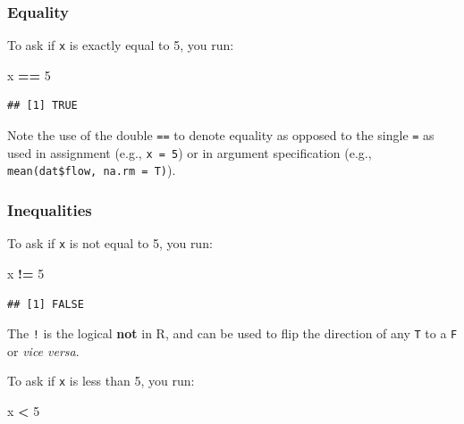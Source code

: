 \documentclass[]{book}
\newenvironment{Shaded}{\begin{snugshade}}{\end{snugshade}}
\newcommand{\DecValTok}[1]{\textcolor[rgb]{0.00,0.00,0.81}{#1}}
\newcommand{\StringTok}[1]{\textcolor[rgb]{0.31,0.60,0.02}{#1}}
\newcommand{\OperatorTok}[1]{\textcolor[rgb]{0.81,0.36,0.00}{\textbf{#1}}}
\newcommand{\NormalTok}[1]{#1}
\theoremstyle{definition}
\theoremstyle{definition}
\theoremstyle{definition}
\theoremstyle{remark}
\begin{document}
\subsubsection*{Equality}\label{equality}

To ask if \texttt{x} is exactly equal to 5, you run:

\begin{Shaded}
\begin{Highlighting}[]
\NormalTok{x }\OperatorTok{==}\StringTok{ }\DecValTok{5}
\end{Highlighting}
\end{Shaded}

\begin{verbatim}
## [1] TRUE
\end{verbatim}

Note the use of the double \texttt{==} to denote equality as opposed to
the single \texttt{=} as used in assignment (e.g., \texttt{x\ =\ 5}) or
in argument specification (e.g.,
\texttt{mean(dat\$flow,\ na.rm\ =\ T)}).

\subsubsection*{Inequalities}\label{inequalities}

To ask if \texttt{x} is not equal to 5, you run:

\begin{Shaded}
\begin{Highlighting}[]
\NormalTok{x }\OperatorTok{!=}\StringTok{ }\DecValTok{5}
\end{Highlighting}
\end{Shaded}

\begin{verbatim}
## [1] FALSE
\end{verbatim}

The \texttt{!} is the logical \textbf{not} in R, and can be used to flip
the direction of any \texttt{T} to a \texttt{F} or \emph{vice versa}.

To ask if \texttt{x} is less than 5, you run:

\begin{Shaded}
\begin{Highlighting}[]
\NormalTok{x }\OperatorTok{<}\StringTok{ }\DecValTok{5}
\end{Highlighting}
\end{Shaded}
\end{document}
